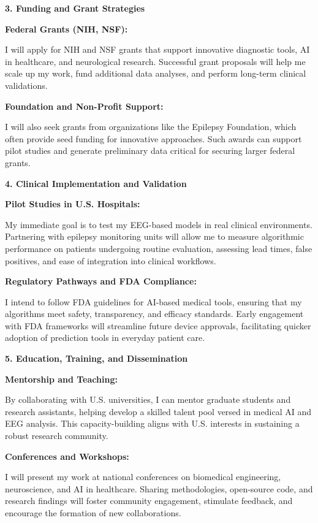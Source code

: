 \documentclass{article}
\begin{document}
{\bf 3. Funding and Grant Strategies }

{\bf Federal Grants (NIH, NSF): }

I will apply for NIH and NSF grants that support innovative diagnostic tools, AI in healthcare, and neurological research. Successful grant proposals will help me scale up my work, fund additional data analyses, and perform long-term clinical validations.

{\bf Foundation and Non-Profit Support: }

I will also seek grants from organizations like the Epilepsy Foundation, which often provide seed funding for innovative approaches. Such awards can support pilot studies and generate preliminary data critical for securing larger federal grants.

{\bf 4. Clinical Implementation and Validation }

{\bf Pilot Studies in U.S. Hospitals: }

My immediate goal is to test my EEG-based models in real clinical environments. Partnering with epilepsy monitoring units will allow me to measure algorithmic performance on patients undergoing routine evaluation, assessing lead times, false positives, and ease of integration into clinical workflows.

{\bf Regulatory Pathways and FDA Compliance: }

I intend to follow FDA guidelines for AI-based medical tools, ensuring that my algorithms meet safety, transparency, and efficacy standards. Early engagement with FDA frameworks will streamline future device approvals, facilitating quicker adoption of prediction tools in everyday patient care.

{\bf 5. Education, Training, and Dissemination }

{\bf Mentorship and Teaching: }

By collaborating with U.S. universities, I can mentor graduate students and research assistants, helping develop a skilled talent pool versed in medical AI and EEG analysis. This capacity-building aligns with U.S. interests in sustaining a robust research community.

{\bf Conferences and Workshops: }

I will present my work at national conferences on biomedical engineering, neuroscience, and AI in healthcare. Sharing methodologies, open-source code, and research findings will foster community engagement, stimulate feedback, and encourage the formation of new collaborations.
\end{document}
